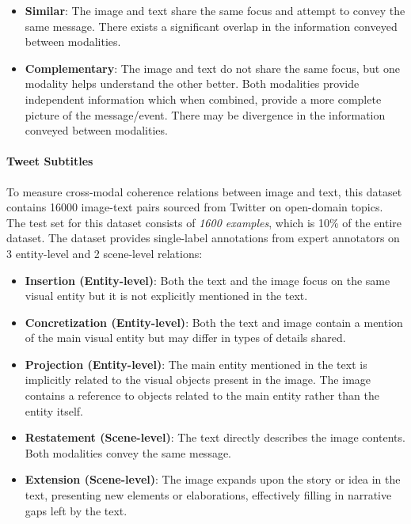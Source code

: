 \begin{itemize}[leftmargin=3.3mm]
    \item \textbf{Similar}: The image and text share the same focus and attempt to convey the same message. There exists a significant overlap in the information conveyed between modalities. 
    \item \textbf{Complementary}:  The image and text do not share the same focus, but one modality helps understand the other better. Both modalities provide independent information which when combined, provide a more complete picture of the message/event. There may be divergence in the information conveyed between modalities.

\end{itemize}

\paragraph{Tweet Subtitles}
To measure cross-modal coherence relations between image and text, this dataset \cite{Xu2022-ie} contains 16000 image-text pairs sourced from Twitter on open-domain topics. The test set for this dataset consists of \textit{1600 examples}, which is 10\% of the entire dataset. The dataset provides single-label annotations from expert annotators on 3 entity-level and 2 scene-level relations:

\begin{itemize}[leftmargin=3.3mm]
    \item \textbf{Insertion (Entity-level)}: Both the text and the image focus on the same visual entity but it is not explicitly mentioned in the text.
    \item \textbf{Concretization (Entity-level)}: Both the text and image contain a mention of the main visual entity but may differ in types of details shared.
    \item \textbf{Projection (Entity-level)}: The main entity mentioned in the text is implicitly related to the visual objects present in the image. The image contains a reference to objects related to the main entity rather than the entity itself.
    \item \textbf{Restatement (Scene-level)}: The text directly describes the image contents. Both modalities convey the same message.
    \item \textbf{Extension (Scene-level)}: The image expands upon the story or idea in the text, presenting new elements or elaborations, effectively filling in narrative gaps left by the text.
\end{itemize}

